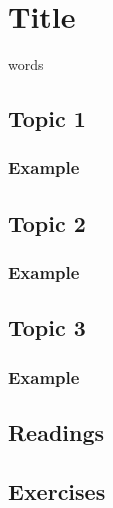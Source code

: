 \section{Title}
words
\subsection{Topic 1}
\subsubsection{Example}
\subsection{Topic 2}
\subsubsection{Example}
\subsection{Topic 3}
\subsubsection{Example}
\subsection{Readings}
\subsection{Exercises}